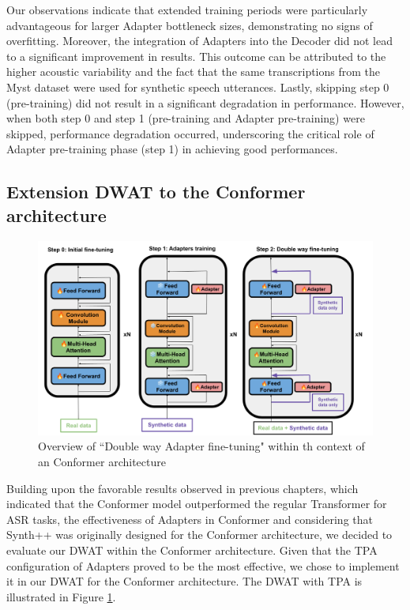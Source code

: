 Our observations indicate that extended training periods were particularly advantageous for larger Adapter bottleneck sizes, demonstrating no signs of overfitting. Moreover, the integration of Adapters into the Decoder did not lead to a significant improvement in results. This outcome can be attributed to the higher acoustic variability and the fact that the same transcriptions from the Myst dataset were used for synthetic speech utterances. Lastly, skipping step 0 (pre-training) did not result in a significant degradation in performance. However, when both step 0 and step 1 (pre-training and Adapter pre-training) were skipped, performance degradation occurred, underscoring the critical role of Adapter pre-training phase (step 1) in achieving good performances.

\subsection{Extension DWAT to the Conformer architecture}
\begin{figure}
    \centering
    \includegraphics[width=\textwidth]{imgs/Overall_system.png}
    \caption{Overview of ``Double way Adapter fine-tuning"  within th context of an Conformer architecture}
    \label{fig:TTS_conformer}
\end{figure}
Building upon the favorable results observed in previous chapters, which indicated that the Conformer model outperformed the regular Transformer for \ac{ASR} tasks, the effectiveness of Adapters in Conformer and  considering that Synth++ \cite{hu2022synt++} was originally designed for the Conformer architecture, we decided to evaluate our \ac{DWAT} within the Conformer architecture. Given that the TPA configuration of Adapters proved to be the most effective, we chose to implement it in our \ac{DWAT} for the Conformer architecture. The \ac{DWAT} with TPA is illustrated in Figure \ref{fig:TTS_conformer}.

